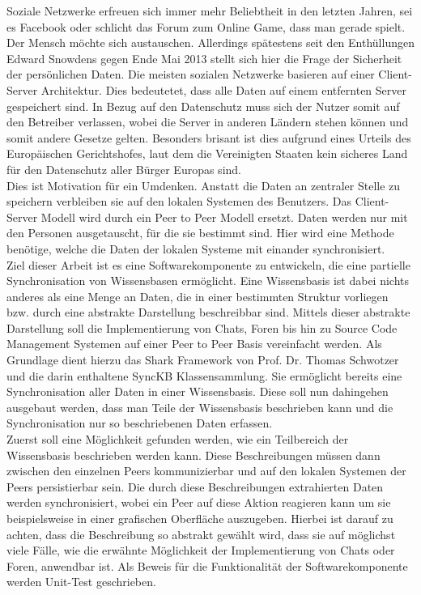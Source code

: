 \documentclass[a4paper]{article}
\begin{document}
	Soziale Netzwerke erfreuen sich immer mehr Beliebtheit in den letzten Jahren, 
	sei es Facebook oder schlicht das Forum zum Online Game, dass man gerade
	spielt. Der Mensch möchte sich austauschen. Allerdings spätestens seit den
	Enthüllungen Edward Snowdens gegen Ende Mai 2013 stellt sich hier die Frage
	der Sicherheit der persönlichen Daten. Die meisten sozialen Netzwerke basieren
	auf einer Client-Server Architektur. Dies bedeutetet, dass alle Daten auf einem
	entfernten Server gespeichert sind. In Bezug auf den Datenschutz muss sich der
	Nutzer somit auf den Betreiber verlassen, wobei die
	Server in anderen Ländern stehen können und somit andere Gesetze gelten.
	Besonders brisant ist dies aufgrund eines
	Urteils des Europäischen Gerichtshofes, laut dem die Vereinigten Staaten kein
	sicheres Land für den Datenschutz aller Bürger Europas sind. \cite{welt} \\
	 
	Dies ist Motivation für ein Umdenken. Anstatt die Daten an zentraler Stelle
	zu speichern verbleiben sie auf den lokalen Systemen des Benutzers. Das
	Client-Server Modell wird durch ein Peer to Peer Modell ersetzt. Daten
	werden nur mit den Personen ausgetauscht, für die sie bestimmt sind.
	Hier wird eine Methode benötige, welche die Daten der lokalen Systeme
	mit einander synchronisiert. \\

	Ziel dieser Arbeit ist es eine Softwarekomponente zu entwickeln, die eine 
	partielle Synchronisation von Wissensbasen ermöglicht. Eine Wissensbasis
	ist dabei nichts anderes als eine Menge an Daten, die in einer
	bestimmten Struktur vorliegen bzw. durch eine abstrakte Darstellung
	beschreibbar sind. Mittels dieser abstrakte Darstellung soll die 
	Implementierung von Chats, Foren bis hin zu Source Code Management Systemen
	auf einer Peer to Peer Basis vereinfacht werden.
	Als Grundlage dient hierzu das Shark Framework \cite{SharkFW} von Prof.
	Dr.	Thomas Schwotzer und die darin enthaltene SyncKB Klassensammlung. Sie
	ermöglicht bereits eine Synchronisation aller Daten in einer Wissensbasis.
	Diese soll nun dahingehen ausgebaut werden, dass man Teile der Wissensbasis
	beschrieben kann und die Synchronisation nur so beschriebenen Daten erfassen. \\
	
	Zuerst soll eine Möglichkeit gefunden werden, wie ein Teilbereich der
	Wissensbasis beschrieben werden kann. Diese Beschreibungen müssen dann
	zwischen den einzelnen Peers kommunizierbar und auf den lokalen Systemen der
	Peers persistierbar sein. Die durch diese Beschreibungen extrahierten Daten
	werden synchronisiert, wobei ein Peer auf diese Aktion reagieren kann um
	sie beispielsweise in einer grafischen Oberfläche auszugeben. Hierbei
	ist darauf zu achten, dass die Beschreibung so abstrakt gewählt wird, dass 
	sie	auf möglichst viele Fälle, wie die erwähnte Möglichkeit der 
	Implementierung von Chats oder Foren, anwendbar ist. Als Beweis für die
	Funktionalität der Softwarekomponente werden Unit-Test geschrieben. \\
	
\end{document}
